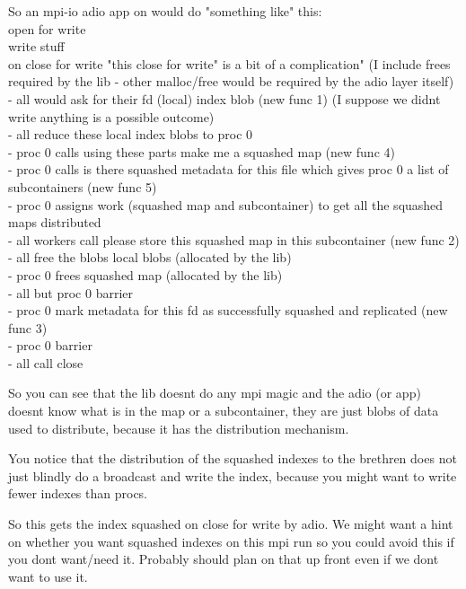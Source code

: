 So an mpi-io adio app on would do "something like" this:
\\
open for write
\\
write stuff
\\
on close for write "this close for write" is a bit of a complication"
(I include frees required by the lib - other malloc/free would
be required by the adio layer itself)
- all would ask for their fd (local) index blob  (new func 1)
 (I suppose we didnt write anything is a possible outcome)
\\
- all reduce these local index blobs to proc 0
\\
- proc 0 calls using these parts make me a squashed map (new func 4)
\\
- proc 0 calls is there squashed metadata for this file
  which gives proc 0 a list of subcontainers (new func 5)
\\
- proc 0 assigns work (squashed map and subcontainer) to get
  all the squashed maps distributed
\\
- all workers call please store this squashed map in this subcontainer
(new func 2)
\\
- all free the blobs local blobs (allocated by the lib)
\\
- proc 0 frees squashed map (allocated by the lib)
\\
- all but proc 0 barrier
\\
- proc 0 mark metadata for this fd as successfully squashed and
replicated  (new func 3)
\\
- proc 0 barrier
\\
- all call close

So you can see that the lib doesnt do any mpi magic and the adio (or
app) doesnt know what is in the map or a subcontainer, they are just
blobs of data used to distribute, because it has the distribution
mechanism.

You notice that the distribution of the squashed indexes to
the brethren does not just blindly do a broadcast and write
the index, because you might want to write fewer indexes
than procs.

So this gets the index squashed on close for write by adio.
We might want a hint on whether you want squashed indexes
on this mpi run so you could avoid this if you dont want/need
it.  Probably should plan on that up front even if we dont
want to use it.

